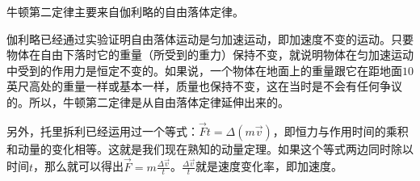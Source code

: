 \begin{prove}
    牛顿第二定律主要来自伽利略的自由落体定律。

    伽利略已经通过实验证明自由落体运动是匀加速运动，即加速度不变的运动。只要物体在自由下落时它的重量（所受到的重力）保持不变，就说明物体在匀加速运动中受到的作用力是恒定不变的。如果说，一个物体在地面上的重量跟它在距地面$10$英尺高处的重量一样或基本一样，质量也保持不变，这在当时是不会有任何争议的。所以，牛顿第二定律是从自由落体定律延伸出来的。

    另外，托里拆利已经运用过一个等式：$\vec{F}t=\Delta (m\vec{v})$，即恒力与作用时间的乘积和动量的变化相等。这就是我们现在熟知的动量定理。如果这个等式两边同时除以时间$t$，那么就可以得出$\displaystyle \vec{F}=m\frac{\Delta \vec{v}}{t}$。$\displaystyle\frac{\Delta \vec{v}}{t}$就是速度变化率，即加速度。
\end{prove}

